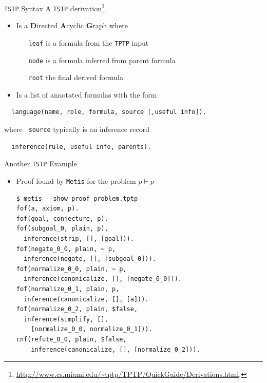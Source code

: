 \documentclass[10pt, xetex, hyperref={pdfpagelabels=false}]{beamer}
\newcommand{\prg}[1]{\texttt{#1}\xspace}
\newcommand{\Metis}{\prg{Metis}}
\newcommand{\len}[1]{\texttt{#1}\xspace}
\newcommand{\TPTP}{\len{TPTP}}
\newcommand{\TSTP}{\len{TSTP}}
\begin{document}
\begin{frame}[fragile]{\TSTP Syntax}
A \TSTP derivation\footnote{\url{http://www.cs.miami.edu/~tptp/TPTP/QuickGuide/Derivations.html}.}
\begin{itemize}
  \item Is a \textbf{D}irected \textbf{A}cyclic \textbf{G}raph where
  \begin{itemize}
    \item[\texttt{leaf}] is a formula from the \TPTP input
    \item[\texttt{node}] is a formula inferred from parent formula
    \item[\texttt{root}] the final derived formula
  \end{itemize}
  \item Is a list of annotated formulas with the form
  \end{itemize}

\begin{verbatim}
  language(name, role, formula, source [,useful info]).
\end{verbatim}

where \texttt{\color{blu} source} typically is an inference record
\begin{verbatim}
  inference(rule, useful info, parents).
\end{verbatim}
\end{frame}


\begin{frame}[fragile, label=tstp-example]{Another \TSTP Example}

\begin{itemize}
  \item Proof found by \Metis for the problem $p ⊢ p$
{\small
\begin{verbatim}
$ metis --show proof problem.tptp
fof(a, axiom, p).
fof(goal, conjecture, p).
fof(subgoal_0, plain, p),
  inference(strip, [], [goal])).
fof(negate_0_0, plain, ~ p,
  inference(negate, [], [subgoal_0])).
fof(normalize_0_0, plain, ~ p,
  inference(canonicalize, [], [negate_0_0])).
fof(normalize_0_1, plain, p,
  inference(canonicalize, [], [a])).
fof(normalize_0_2, plain, $false,
  inference(simplify, [],
    [normalize_0_0, normalize_0_1])).
cnf(refute_0_0, plain, $false,
    inference(canonicalize, [], [normalize_0_2])).
\end{verbatim}
}
\end{itemize}
\end{frame}
\end{document}
